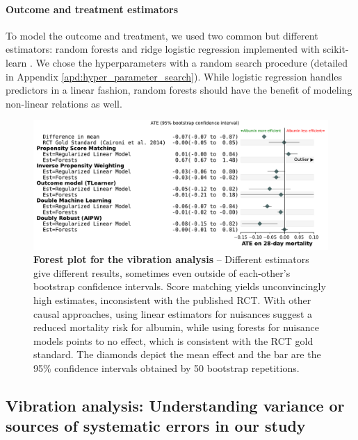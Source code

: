 \documentclass[french,12pt,twoside,a4paper]{book}
\begin{document}
\paragraph{Outcome and treatment estimators}

To model the outcome and treatment, we used two common but different estimators:
random forests and ridge logistic regression implemented with scikit-learn
\citep{pedregosa_scikitlearn_2011}. We chose the hyperparameters with a random search
procedure (detailed in Appendix \ref{apd:hyper_parameter_search}). While
logistic regression handles predictors in a linear fashion, random forests
should have the benefit of modeling non-linear relations as well.

\begin{figure}[h!]
  \centering
  \includegraphics[width=\linewidth]{img/chapter_4/albumin_for_sepsis__obs_1d__estimates_20230712__est_lr_rf__bs_50.pdf}
  \caption{\textbf{Forest plot for the vibration analysis} -- Different
    estimators give different results, sometimes even outside of
    each-other's bootstrap confidence intervals. Score matching yields
    unconvincingly high estimates, inconsistent with the published RCT.
    With other causal approaches, using linear estimators for nuisances
    suggest a reduced mortality risk for albumin, while using forests for
    nuisance models points to no effect, which is consistent with the RCT gold standard.
    The diamonds
    depict the mean effect and the bar are the 95\% confidence intervals
    obtained by 50 bootstrap repetitions.}\label{fig:albumin_for_sepsis:results}
\end{figure}

\subsection{Vibration analysis: Understanding variance or sources of
  systematic errors in our study}\label{subsec:causal_tuto:vibration_mimic}
\end{document}
